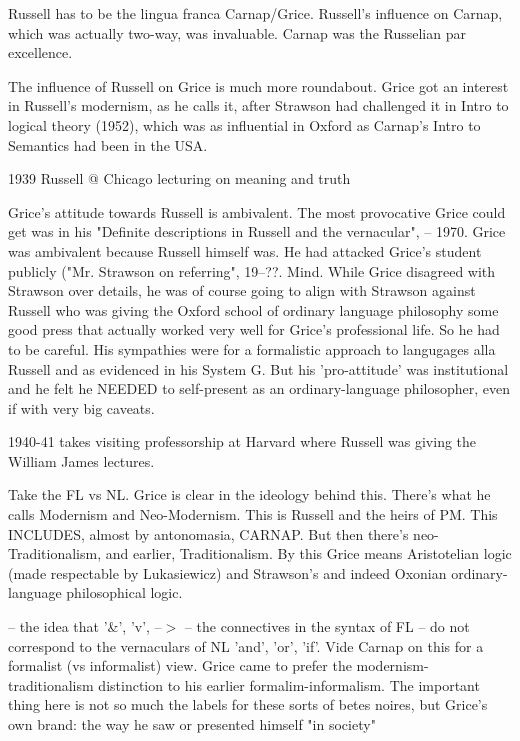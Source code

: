 \documentclass[10pt,titlepage]{book}
\begin{document}
{Russell has to be the lingua franca Carnap/Grice.
Russell's influence on Carnap, which was actually two-way, was invaluable.
Carnap was the Russelian par excellence.

The influence of Russell on Grice is much more roundabout. 
Grice got  an interest in Russell's modernism, as he calls it, after 
Strawson had  challenged it in Intro to logical theory (1952), which was as 
influential in  Oxford as Carnap's Intro to Semantics had been in the USA.

1939 Russell @ Chicago lecturing on meaning and  truth  

Grice's attitude towards Russell is ambivalent.
The most provocative Grice could get was in his "Definite descriptions in Russell and the vernacular", -- 1970.
Grice was ambivalent because Russell himself was.
He had attacked Grice's student publicly ("Mr. Strawson on referring", 19--??. Mind.
While Grice disagreed with Strawson over details, he was of course going to align with Strawson against Russell who was giving the Oxford school of ordinary language philosophy some good press that actually worked very well for Grice's  professional life.
So he had to be careful.
His sympathies were for a formalistic approach to langugages alla Russell and as evidenced in his System G.
But his 'pro-attitude' was institutional and he felt he NEEDED to self-present as an ordinary-language philosopher, even if with very big caveats.
 
1940-41 takes visiting professorship at Harvard  where Russell was giving 
the William James lectures.  

Take the FL vs NL.
Grice is clear in the ideology behind this.
There's what he calls Modernism and Neo-Modernism.
This is Russell and the heirs of PM.
This INCLUDES, almost by antonomasia, CARNAP.
But then there's neo-Traditionalism, and earlier, Traditionalism.
By this Grice means Aristotelian logic (made respectable by Lukasiewicz) and Strawson's and indeed Oxonian ordinary-language philosophical logic. 

--  the idea that '\&', 'v', --$>$ -- the connectives in the syntax of FL -- 
do  not correspond to the vernaculars of NL 'and', 'or', 'if'. Vide Carnap on 
this  for a formalist (vs informalist) view. Grice came to prefer the  
modernism-traditionalism distinction to his earlier formalim-informalism. The  
important thing here is not so much the labels for these sorts of betes 
noires,  but Grice's own brand: the way he saw or presented himself "in society" 

}
\end{document}
